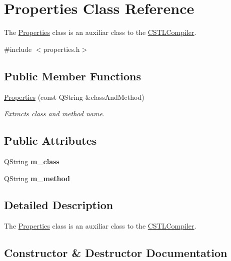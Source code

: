 \hypertarget{class_properties}{}\section{Properties Class Reference}
\label{class_properties}


The \hyperlink{class_properties}{Properties} class is an auxiliar class to the \hyperlink{class_c_s_t_l_compiler}{C\+S\+T\+L\+Compiler}.  




{\ttfamily \#include $<$properties.\+h$>$}

\subsection*{Public Member Functions}
\begin{DoxyCompactItemize}
\item 
\hyperlink{class_properties_a8ec1c6bfb9eb2da106cffba3a3d5c18e}{Properties} (const Q\+String \&class\+And\+Method)
\begin{DoxyCompactList}\small\item\em Extracts class and method name. \end{DoxyCompactList}\end{DoxyCompactItemize}
\subsection*{Public Attributes}
\begin{DoxyCompactItemize}
\item 
\mbox{\label{class_properties_a4efcf4114fb0d0163a0d6a6e894be7f3}} 
Q\+String {\bfseries m\+\_\+class}
\item 
\mbox{\label{class_properties_ae5f86c3cc9714e6d6dd13c8d693d3343}} 
Q\+String {\bfseries m\+\_\+method}
\end{DoxyCompactItemize}


\subsection{Detailed Description}
The \hyperlink{class_properties}{Properties} class is an auxiliar class to the \hyperlink{class_c_s_t_l_compiler}{C\+S\+T\+L\+Compiler}. 

\subsection{Constructor \& Destructor Documentation}
\mbox{\label{class_properties_a8ec1c6bfb9eb2da106cffba3a3d5c18e}} 

